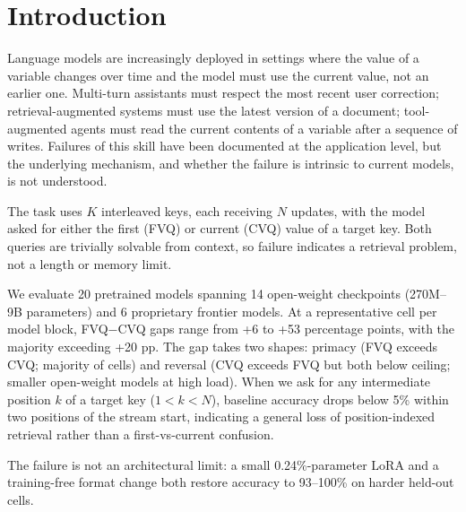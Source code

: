 \documentclass[11pt]{article}
\begin{document}
\section{Introduction}

Language models are increasingly deployed in settings where the value
of a variable changes over time and the model must use the current
value, not an earlier one.
Multi-turn assistants must respect the most recent user correction;
retrieval-augmented systems must use the latest version of a document;
tool-augmented agents must read the current contents of a variable
after a sequence of writes.
Failures of this skill have been documented at the application level,
but the underlying mechanism, and whether the failure is intrinsic to
current models, is not understood.

The task uses $K$ interleaved keys, each receiving $N$ updates, with
the model asked for either the first (FVQ) or current (CVQ) value of
a target key. Both queries are trivially solvable from context, so
failure indicates a retrieval problem, not a length or memory limit.

We evaluate 20 pretrained models spanning 14 open-weight checkpoints
(270M--9B parameters) and 6 proprietary frontier models.
At a representative cell per model block, FVQ$-$CVQ gaps range from
+6 to +53 percentage points, with the majority exceeding +20 pp.
The gap takes two shapes: primacy (FVQ exceeds CVQ; majority of
cells) and reversal (CVQ exceeds FVQ but both below ceiling; smaller
open-weight models at high load).
When we ask for any intermediate position $k$ of a target key
($1 < k < N$), baseline accuracy drops below 5\% within two positions
of the stream start, indicating a general loss of position-indexed
retrieval rather than a first-vs-current confusion.

The failure is not an architectural limit: a small 0.24\%-parameter
LoRA and a training-free format change both restore accuracy to
93--100\% on harder held-out cells.
\end{document}
